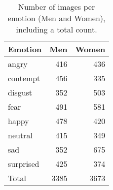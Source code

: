 \begin{table}
\caption{Number of images per emotion (Men and Women), including a total count.}
\label{tab:synthetic_data_counts}
\begin{tabular}{lrr}
\toprule
Emotion & Men & Women \\
\midrule
angry & 416 & 436 \\
contempt & 456 & 335 \\
disgust & 352 & 503 \\
fear & 491 & 581 \\
happy & 478 & 420 \\
neutral & 415 & 349 \\
sad & 352 & 675 \\
surprised & 425 & 374 \\
Total & 3385 & 3673 \\
\bottomrule
\end{tabular}
\end{table}
